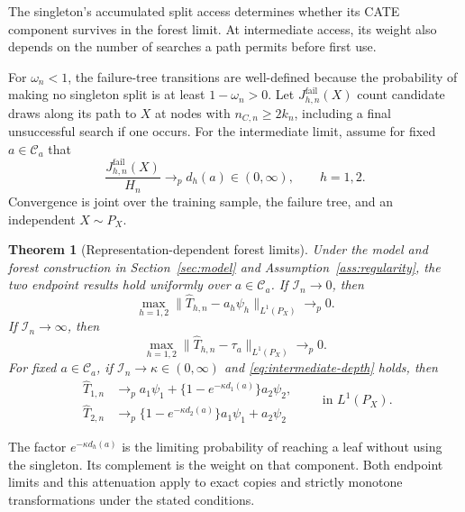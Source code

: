 \documentclass[12pt]{article}
\newtheorem{theorem}{Theorem}
\begin{document}
The singleton's accumulated split access determines whether its CATE component survives in the forest limit. At intermediate access, its weight also depends on the number of searches a path permits before first use.

For \(\omega_n<1\), the failure-tree transitions are well-defined because the probability of making no singleton split is at least \(1-\omega_n>0\). Let \(J_{h,n}^{\mathrm{fail}}(X)\) count candidate draws along its path to \(X\) at nodes with \(n_{C,n}\ge2k_n\), including a final unsuccessful search if one occurs. For the intermediate limit, assume for fixed \(a\in\mathcal C_a\) that
\begin{equation}\label{eq:intermediate-depth}
\frac{J_{h,n}^{\mathrm{fail}}(X)}{H_n}\longrightarrow_p d_h(a)\in(0,\infty),
\qquad h=1,2.
\end{equation}
Convergence is joint over the training sample, the failure tree, and an independent \(X\sim P_X\).

\begin{theorem}[Representation-dependent forest limits]\label{thm:main}
Under the model and forest construction in Section~\ref{sec:model} and Assumption~\ref{ass:regularity}, the two endpoint results hold uniformly over \(a\in\mathcal C_a\). If \(\mathcal I_n\to0\), then
\begin{equation}\label{eq:selection-limit}
\max_{h=1,2}\|\widehat T_{h,n}-a_h\psi_h\|_{L^1(P_X)}\longrightarrow_p0.
\end{equation}
If \(\mathcal I_n\to\infty\), then
\begin{equation}\label{eq:recovery-limit}
\max_{h=1,2}\|\widehat T_{h,n}-\tau_a\|_{L^1(P_X)}\longrightarrow_p0.
\end{equation}
For fixed \(a\in\mathcal C_a\), if \(\mathcal I_n\to\kappa\in(0,\infty)\) and \eqref{eq:intermediate-depth} holds, then
\begin{equation}\label{eq:intermediate-targets}
\begin{aligned}
\widehat T_{1,n}&\longrightarrow_p
 a_1\psi_1+\{1-e^{-\kappa d_1(a)}\}a_2\psi_2,\\
\widehat T_{2,n}&\longrightarrow_p
 \{1-e^{-\kappa d_2(a)}\}a_1\psi_1+a_2\psi_2
\end{aligned}
\qquad\text{in }L^1(P_X).
\end{equation}
\end{theorem}

The factor \(e^{-\kappa d_h(a)}\) is the limiting probability of reaching a leaf without using the singleton. Its complement is the weight on that component. Both endpoint limits and this attenuation apply to exact copies and strictly monotone transformations under the stated conditions.
\end{document}
